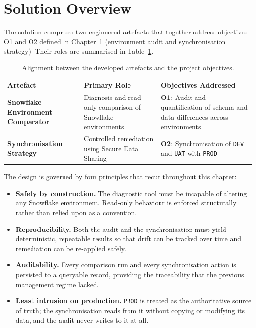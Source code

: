 \section{Solution Overview}
\label{sec:solution-overview}

The solution comprises two engineered artefacts that together address objectives O1 and O2 defined in Chapter~1 (environment audit and synchronisation strategy). Their roles are summarised in Table~\ref{tab:design-objectives}.

\begin{table}[H]
\centering
\small
\renewcommand{\arraystretch}{1.6}
\setlength{\tabcolsep}{8pt}
\begin{tabularx}{\textwidth}{
>{\raggedright\arraybackslash\bfseries}p{4cm}
>{\raggedright\arraybackslash}p{4.2cm}
>{\raggedright\arraybackslash}X}
\toprule
\rowcolor{ibmblue!15}
\textbf{Artefact} &
\textbf{Primary Role} &
\textbf{Objectives Addressed} \\
\midrule
Snowflake Environment Comparator &
Diagnosis and read-only comparison of Snowflake environments &
\textbf{O1}: Audit and quantification of schema and data differences across environments \\
Synchronisation Strategy &
Controlled remediation using Secure Data Sharing &
\textbf{O2}: Synchronisation of \texttt{DEV} and \texttt{UAT} with \texttt{PROD} \\
\bottomrule
\end{tabularx}
\caption{Alignment between the developed artefacts and the project objectives.}
\label{tab:design-objectives}
\end{table}

The design is governed by four principles that recur throughout this chapter:

\begin{itemize}
  \item \textbf{Safety by construction.} The diagnostic tool must be incapable of altering any Snowflake environment. Read-only behaviour is enforced structurally rather than relied upon as a convention.
  \item \textbf{Reproducibility.} Both the audit and the synchronisation must yield deterministic, repeatable results so that drift can be tracked over time and remediation can be re-applied safely.
  \item \textbf{Auditability.} Every comparison run and every synchronisation action is persisted to a queryable record, providing the traceability that the previous management regime lacked.
  \item \textbf{Least intrusion on production.} \texttt{PROD} is treated as the authoritative source of truth; the synchronisation reads from it without copying or modifying its data, and the audit never writes to it at all.
\end{itemize}

